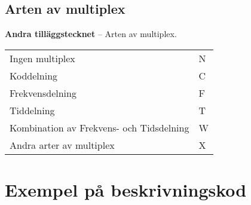 \subsection{Arten av multiplex}
\textbf{Andra tilläggstecknet} -- Arten av multiplex.\\
\begin{tabular}{ll}
	Ingen multiplex & N\\
	Koddelning & C\\
	Frekvensdelning & F\\
	Tiddelning & T\\
	Kombination av Frekvens- och Tidsdelning & W\\
	Andra arter av multiplex & X\\
\end{tabular}


\section{Exempel på beskrivningskod}

